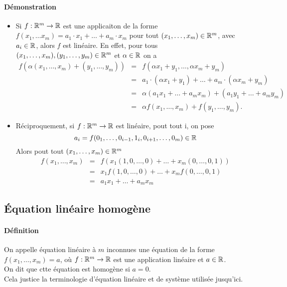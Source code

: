 \paragraph{Démonstration}
\begin{itemize}
  \item Si $f: \mathbb{R}^m \rightarrow \mathbb{R}$ est une applicaiton de la forme $f(x_1, \ldots x_m) = a_1 \cdot x_1 + \ldots + a_m \cdot x_m$ pour tout $(x_1, \ldots, x_m) \in \mathbb{R}^m$, avec $a_i \in \mathbb{R}$, alors $f$ est linéaire. En effet, pour tous $(x_1, \ldots, x_m), (y_1, \ldots, y_m) \in \mathbb{R}^m$ et $\alpha \in \mathbb{R}$ on a
    \begin{eqnarray*}
      f(\alpha(x_1, \ldots, x_m) + (y_1, \ldots, y_m)) &=& f(\alpha x_1 + y_1, \ldots, \alpha x_m + y_m) \\
        &=& a_1 \cdot (\alpha x_1 + y_1) + \ldots + a_m \cdot (\alpha x_m + y_m) \\
        &=& \alpha (a_1 x_1 + \ldots + a_m x_m) + (a_1 y_1 + \ldots + a_m y_m) \\
        &=& \alpha f(x_1, \ldots, x_m) + f(y_1, \ldots, y_m).
    \end{eqnarray*}
  \item Réciproquement, si $f: \mathbb{R}^m \rightarrow \mathbb{R}$ est linéaire, pout tout i, on pose 
    $$a_i = f(0_1, \ldots, 0_{i-1}, 1_i, 0_{i+1}, \ldots, 0_m) \in \mathbb{R}$$
    Alors pout tout $(x_1, \ldots, x_m) \in \mathbb{R}^m$
    \begin{eqnarray*}
      f(x_1, \ldots, x_m) &=& f(x_1 (1, 0, \ldots, 0) + \ldots + x_m (0, \ldots, 0, 1)) \\
        &=& x_1 f(1, 0, \ldots, 0) + \ldots + x_m f(0, \ldots, 0, 1) \\
        &=& a_1 x_1 + \ldots + a_m x_m
    \end{eqnarray*}
\end{itemize}

%
\subsection{Équation linéaire homogène}

%
\paragraph{Définition} On appelle équation linéaire à $m$ inconnues une équation de la forme $f(x_1, \ldots, x_m) = a$, où $f: \mathbb{R}^m \rightarrow \mathbb{R}$ est une application linéaire et $a \in \mathbb{R}$. \\
On dit que ctte équation est homogène si $a=0$. \\
Cela justice la terminologie d'équation linéaire et de système utilisée jusqu'ici.

